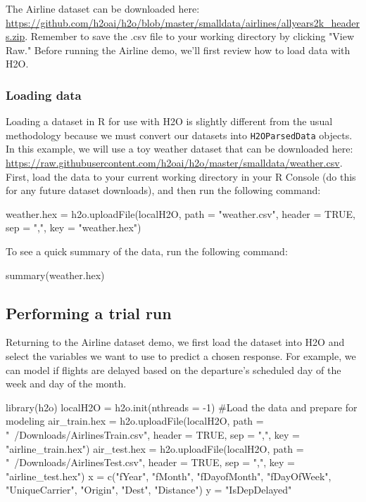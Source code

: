 \documentclass[11pt]{article}
\begin{document}
The Airline dataset can be downloaded here: \url{https://github.com/h2oai/h2o/blob/master/smalldata/airlines/allyears2k_headers.zip}. Remember to save the .csv file to your working directory by clicking  "View Raw."  Before running the Airline demo, we'll first review how to load data with H2O. 

\subsubsection{Loading data} \label{2.5}

Loading a dataset in R for use with H2O is slightly different from the usual methodology because we must convert our datasets into \texttt{H2OParsedData} objects. In this example, we will use a toy weather dataset that can be downloaded here:\\ 
\url{https://raw.githubusercontent.com/h2oai/h2o/master/smalldata/weather.csv}. 
First, load the data to your current working directory in your R Console (do this for any future dataset downloads), and then run the following command:
\begin{spverbatim}
weather.hex = h2o.uploadFile(localH2O, path = "weather.csv", header = TRUE, sep = ",", key = "weather.hex")
\end{spverbatim}
\bigskip
\noindent
To see a quick summary of the data, run the following command:
\begin{spverbatim}
summary(weather.hex)
\end{spverbatim}


\subsection{Performing a trial run} \label{3.2}
Returning to the Airline dataset demo, we first load the dataset into H2O and select the variables we want to use to predict a chosen response. For example, we can model if flights are delayed based on the departure's scheduled day of the week and day of the month.

\begin{spverbatim}

library(h2o)
localH2O = h2o.init(nthreads = -1)
#Load the data and prepare for modeling
air_train.hex = h2o.uploadFile(localH2O, path = "~/Downloads/AirlinesTrain.csv", 
                               header = TRUE, sep = ",", key = "airline_train.hex")
air_test.hex = h2o.uploadFile(localH2O, path = "~/Downloads/AirlinesTest.csv", 
                              header = TRUE, sep = ",", key = "airline_test.hex")
x = c("fYear", "fMonth", "fDayofMonth", "fDayOfWeek", "UniqueCarrier", "Origin",
      "Dest", "Distance")
y = "IsDepDelayed"

\end{spverbatim}
\end{document}
